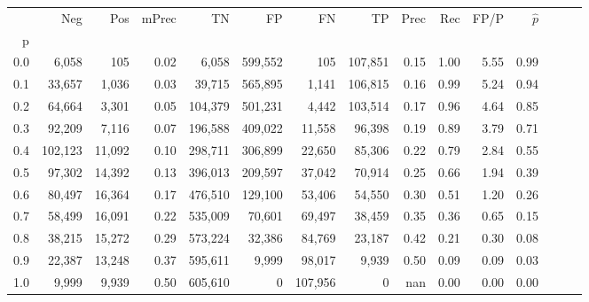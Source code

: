\begin{tabular}{rrrrrrrrrrrrrrr}
\toprule
{} &      Neg &     Pos & mPrec &       TN &       FP &       FN &       TP &  Prec &   Rec &  FP/P & $\hat{p}$ \\
p   &          &         &       &          &          &          &          &       &       &       &           \\
\midrule
0.0 &    6,058 &     105 &  0.02 &    6,058 &  599,552 &      105 &  107,851 &  0.15 &  1.00 &  5.55 &      0.99 \\
0.1 &   33,657 &   1,036 &  0.03 &   39,715 &  565,895 &    1,141 &  106,815 &  0.16 &  0.99 &  5.24 &      0.94 \\
0.2 &   64,664 &   3,301 &  0.05 &  104,379 &  501,231 &    4,442 &  103,514 &  0.17 &  0.96 &  4.64 &      0.85 \\
0.3 &   92,209 &   7,116 &  0.07 &  196,588 &  409,022 &   11,558 &   96,398 &  0.19 &  0.89 &  3.79 &      0.71 \\
0.4 &  102,123 &  11,092 &  0.10 &  298,711 &  306,899 &   22,650 &   85,306 &  0.22 &  0.79 &  2.84 &      0.55 \\
0.5 &   97,302 &  14,392 &  0.13 &  396,013 &  209,597 &   37,042 &   70,914 &  0.25 &  0.66 &  1.94 &      0.39 \\
0.6 &   80,497 &  16,364 &  0.17 &  476,510 &  129,100 &   53,406 &   54,550 &  0.30 &  0.51 &  1.20 &      0.26 \\
0.7 &   58,499 &  16,091 &  0.22 &  535,009 &   70,601 &   69,497 &   38,459 &  0.35 &  0.36 &  0.65 &      0.15 \\
0.8 &   38,215 &  15,272 &  0.29 &  573,224 &   32,386 &   84,769 &   23,187 &  0.42 &  0.21 &  0.30 &      0.08 \\
0.9 &   22,387 &  13,248 &  0.37 &  595,611 &    9,999 &   98,017 &    9,939 &  0.50 &  0.09 &  0.09 &      0.03 \\
1.0 &    9,999 &   9,939 &  0.50 &  605,610 &        0 &  107,956 &        0 &   nan &  0.00 &  0.00 &      0.00 \\
\bottomrule
\end{tabular}
